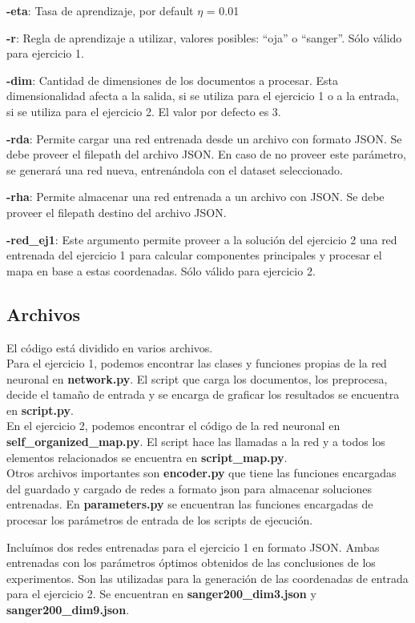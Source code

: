\textbf{-eta}: Tasa de aprendizaje, por default $\eta$ = 0.01

\textbf{-r}: Regla de aprendizaje a utilizar, valores posibles: ``oja'' o ``sanger''. Sólo válido para ejercicio 1.

\textbf{-dim}: Cantidad de dimensiones de los documentos a procesar. Esta dimensionalidad afecta a la salida, si se utiliza para el ejercicio 1 o a la entrada, si se utiliza para el ejercicio
2. El valor por defecto es 3.

\textbf{-rda}: Permite cargar una red entrenada desde un archivo con formato JSON. Se debe proveer el filepath del archivo JSON. En caso de no proveer este parámetro, se generará una red nueva, entrenándola con el dataset seleccionado.

\textbf{-rha}: Permite almacenar una red entrenada a un archivo con JSON. Se debe proveer el filepath destino del archivo JSON.

\textbf{-red\_ej1}: Este argumento permite proveer a la solución del ejercicio 2 una red entrenada del ejercicio 1 para calcular componentes principales y procesar el mapa en base a estas coordenadas. Sólo válido para ejercicio 2. 

\subsection{Archivos}

El código está dividido en varios archivos.\\
Para el ejercicio 1, podemos encontrar las clases y funciones propias de la red neuronal en \textbf{network.py}. El script que carga los documentos, los preprocesa, decide el tamaño de entrada y se encarga de graficar los resultados se encuentra en \textbf{script.py}.\\

En el ejercicio 2, podemos encontrar el código de la red neuronal en \textbf{self\_organized\_map.py}. El script hace las llamadas a la red y a todos los elementos relacionados se encuentra en 
\textbf{script\_map.py}.\\

Otros archivos importantes son \textbf{encoder.py} que tiene las funciones encargadas del guardado y cargado de redes a formato json para almacenar soluciones entrenadas. En \textbf{parameters.py} se encuentran las funciones encargadas de procesar los parámetros de entrada de los scripts de ejecución.

Incluímos dos redes entrenadas para el ejercicio 1 en formato JSON. Ambas entrenadas con los parámetros óptimos obtenidos de las conclusiones de los experimentos. Son las utilizadas para la generación de las coordenadas de entrada para el ejercicio 2. Se encuentran en \textbf{sanger200\_dim3.json} y \textbf{sanger200\_dim9.json}.
